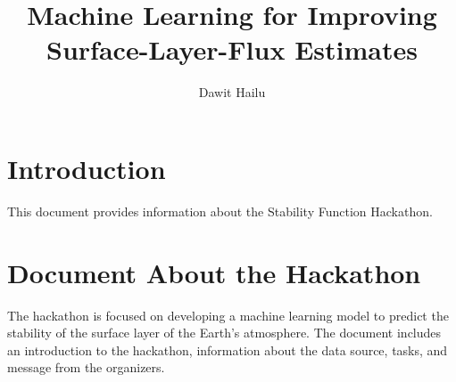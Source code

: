 \documentclass{article}
\title{Machine Learning for Improving Surface-Layer-Flux Estimates}
\author{Dawit Hailu}
\begin{document}
\maketitle

\section{Introduction}

This document provides information about the Stability Function Hackathon.

\section{Document About the Hackathon}

The hackathon is focused on developing a machine learning model to predict the stability of the surface layer of the Earth's atmosphere. The document includes an introduction to the hackathon, information about the data source, tasks, and message from the organizers.
\end{document}
